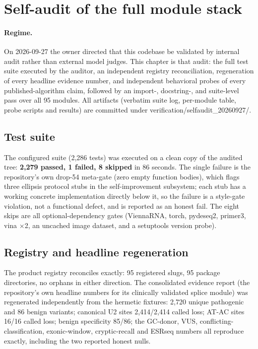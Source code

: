 \section{Self-audit of the full module stack}
\paragraph{Regime.} On 2026-09-27 the owner directed that this codebase be validated by internal audit rather than external model judges. This chapter is that audit: the full test suite executed by the auditor, an independent registry reconciliation, regeneration of every headline evidence number, and independent behavioral probes of every published-algorithm claim, followed by an import-, docstring-, and suite-level pass over all 95 modules. All artifacts (verbatim suite log, per-module table, probe scripts and results) are committed under verification/selfaudit\_20260927/.
\subsection{Test suite}
The configured suite (2,286 tests) was executed on a clean copy of the audited tree: \textbf{2,279 passed, 1 failed, 8 skipped} in 86 seconds. The single failure is the repository's own drop-54 meta-gate (zero empty function bodies), which flags three ellipsis protocol stubs in the self-improvement subsystem; each stub has a working concrete implementation directly below it, so the failure is a style-gate violation, not a functional defect, and is reported as an honest fail. The eight skips are all optional-dependency gates (ViennaRNA, torch, pydeseq2, primer3, vina $\times$2, an uncached image dataset, and a setuptools version probe).
\subsection{Registry and headline regeneration}
The product registry reconciles exactly: 95 registered slugs, 95 package directories, no orphans in either direction. The consolidated evidence report (the repository's own headline numbers for its clinically validated splice module) was regenerated independently from the hermetic fixtures: 2,720 unique pathogenic and 86 benign variants; canonical U2 sites 2,414/2,414 called loss; AT-AC sites 16/16 called loss; benign specificity 85/86; the GC-donor, VUS, conflicting-classification, exonic-window, cryptic-recall and ESRseq numbers all reproduce exactly, including the two reported honest nulls.
